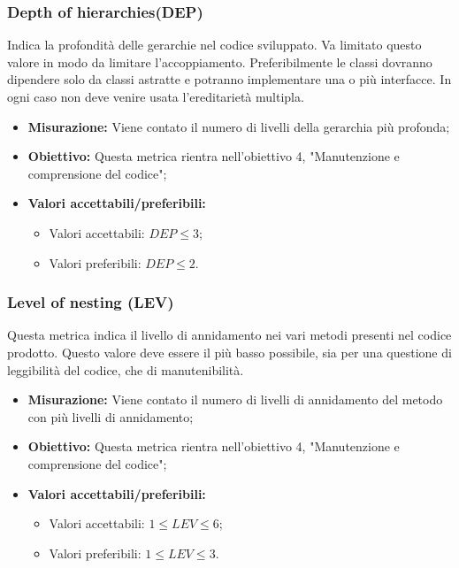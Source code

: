\subsubsection{Depth of hierarchies(DEP)}
Indica la profondità delle gerarchie nel codice sviluppato. Va limitato questo valore in modo da limitare l'accoppiamento. Preferibilmente le classi dovranno dipendere solo da classi astratte e potranno implementare una o più interfacce. In ogni caso non deve venire usata l'ereditarietà multipla.
\begin{itemize}
	\item \textbf{Misurazione:} Viene contato il numero di livelli della gerarchia più profonda;
	\item \textbf{Obiettivo:} Questa metrica rientra nell'obiettivo 4, "Manutenzione e comprensione del codice";
	\item \textbf{Valori accettabili/preferibili: }
	\begin{itemize}
		\item Valori accettabili: $DEP \leq 3$;
		\item Valori preferibili: $DEP \leq 2$.
	\end{itemize}
\end{itemize}

\subsubsection{Level of nesting (LEV)}
Questa metrica indica il livello di annidamento nei vari metodi presenti nel codice prodotto. Questo valore deve essere il più basso possibile, sia per una questione di leggibilità del codice, che di manutenibilità.
\begin{itemize}
	\item \textbf{Misurazione:} Viene contato il numero di livelli di annidamento del metodo con più livelli di annidamento;
	\item \textbf{Obiettivo:} Questa metrica rientra nell'obiettivo 4, "Manutenzione e comprensione del codice";
	\item \textbf{Valori accettabili/preferibili: }
	\begin{itemize}
		\item Valori accettabili: $1\leq LEV \leq 6$;
		\item Valori preferibili: $1\leq LEV \leq 3$.
	\end{itemize}
\end{itemize}


